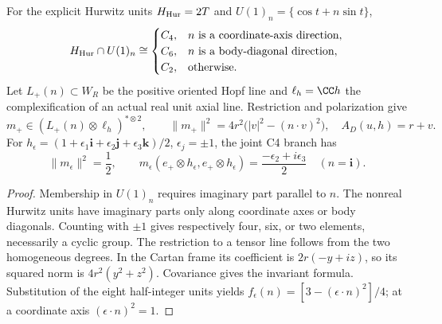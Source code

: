 \documentclass[11pt]{article}
\begin{document}
\begin{corollary}
\label{p1:cor:joint-c4-quadratic-nonvanishing}
For the explicit Hurwitz units \(H_{\rm Hur}=2T\) and
\(U(1)_n=\{\cos t+n\sin t\}\),
\[
 H_{\rm Hur}\cap U(1)_n\cong
 \begin{cases}
 C_4,&n\text{ is a coordinate-axis direction},\\
 C_6,&n\text{ is a body-diagonal direction},\\
 C_2,&\text{otherwise}.
 \end{cases}
\]
Let \(L_+(n)\subset W_R\) be the positive oriented Hopf line and
\(\ell_h=\CC h\) the complexification of an actual real unit axial line.
Restriction and polarization give
\[
 m_+\in (L_+(n)\otimes\ell_h)^{*\otimes2},\qquad
 \|m_+\|^2=4r^2\bigl(|v|^2-(n\cdot v)^2\bigr),
 \quad A_D(u,h)=r+v.
\]
For
\(h_\epsilon=(1+\epsilon_1\mathbf i+\epsilon_2\mathbf j+
\epsilon_3\mathbf k)/2\), \(\epsilon_j=\pm1\), the joint C4 branch has
\[
 \|m_\epsilon\|^2=\frac12,
 \qquad
 m_\epsilon(e_+\otimes h_\epsilon,e_+\otimes h_\epsilon)
       =\frac{-\epsilon_2+i\epsilon_3}{2}
 \quad(n=\mathbf i).
\]
\end{corollary}

\begin{proof}
Membership in \(U(1)_n\) requires imaginary part parallel to \(n\).
The nonreal Hurwitz units have imaginary parts only along coordinate axes
or body diagonals.  Counting with \(\pm1\) gives respectively four, six,
or two elements, necessarily a cyclic group.  The restriction to a tensor
line follows from the two homogeneous degrees.  In the Cartan frame its
coefficient is \(2r(-y+iz)\), so its squared norm is
\(4r^2(y^2+z^2)\).  Covariance gives the invariant formula.  Substitution
of the eight half-integer units yields
\(f_\epsilon(n)=[3-(\epsilon\cdot n)^2]/4\); at a coordinate axis
\((\epsilon\cdot n)^2=1\).
\end{proof}
\end{document}

